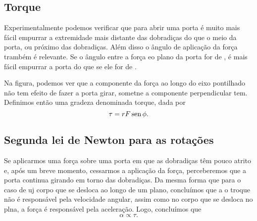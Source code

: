 \subsection{Torque}

Experimentalmente podemos verificar que para abrir uma porta é muito mais fácil empurrar a extremidade mais distante das dobradiças do que o meio da porta, ou próximo das dobradiças. Além disso o ângulo de aplicação da força trambém é relevante. Se o ângulo entre a força eo plano da porta for de , é mais fácil empurrar a porta do que se ele for de .


Na figura, podemos ver que a componente da força ao longo do eixo pontilhado não tem efeito de fazer a porta girar, sometne a componente perpendicular tem. Definimos então uma gradeza denominada torque, dada por
\begin{equation}\label{Eq:DefModTorque}
	\tau = r F \operatorname{sen}\phi.
\end{equation}


\subsection{Segunda lei de Newton para as rotações}

Se aplicarmos uma força sobre uma porta em que as dobradiças têm pouco atrito e, após um breve momento, cessarmos a aplicação da força, perceberemos que a porta continua girando em torno das dobradiças. Da mesma forma que para o caso de uj corpo que se desloca ao longo de um plano, concluímos que a o troque não é responsável pela velocidade angular, assim como no corpo que se desloca no plna, a força é responsável pela aceleração. Logo, concluímos que
\begin{equation}
	\alpha \propto \tau.
\end{equation}

